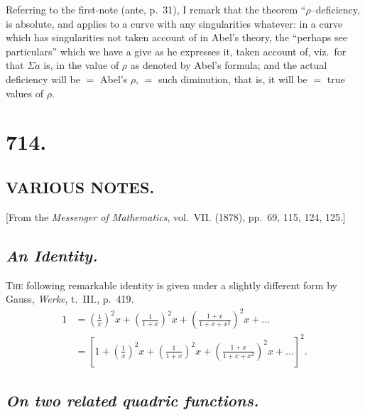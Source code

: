 \documentclass[12pt,a4paper,oneside]{book}
\theoremstyle{plain}
\theoremstyle{definition}
\theoremstyle{remark}
\begin{document}
Referring to the first-note (ante, p.~31), I remark that the theorem ``$\rho$--deficiency, is absolute, and applies to a curve with any singularities whatever: in a curve which has singularities not taken account of in Abel's theory, the ``perhaps see particulars'' which we have a give as he expresses it, taken account of, viz.\ for that $\Sigma a$ is, in the value of $\rho$ as denoted by Abel's formula; and the actual deficiency will be $=$ Abel's $\rho$, $=$ such diminution, that is, it will be $=$ true values of $\rho$.

\vspace{2em}
\noindent\dotfill

\newpage
\section*{714.}
\subsection*{VARIOUS NOTES.}

\begin{center}
\small [From the \textit{Messenger of Mathematics}, vol.~VII. (1878), pp.~69, 115, 124, 125.]
\end{center}

\medskip

\subsection*{\textit{An Identity.}}

\textsc{The} following remarkable identity is given under a slightly different form by Gauss, \textit{Werke}, t.~III., p.~419.
\begin{align*}
1&=\left(\frac{1}{x}\right)^2x+\left(\frac{1}{1+x}\right)^2x+\left(\frac{1+x}{1+x+x^2}\right)^2x+\dots\\
&=\left[1+\left(\frac{1}{x}\right)^2x+\left(\frac{1}{1+x}\right)^2x+\left(\frac{1+x}{1+x+x^2}\right)^2x+\dots\right]^2.
\end{align*}

\subsection*{\textit{On two related quadric functions.}}
\end{document}
